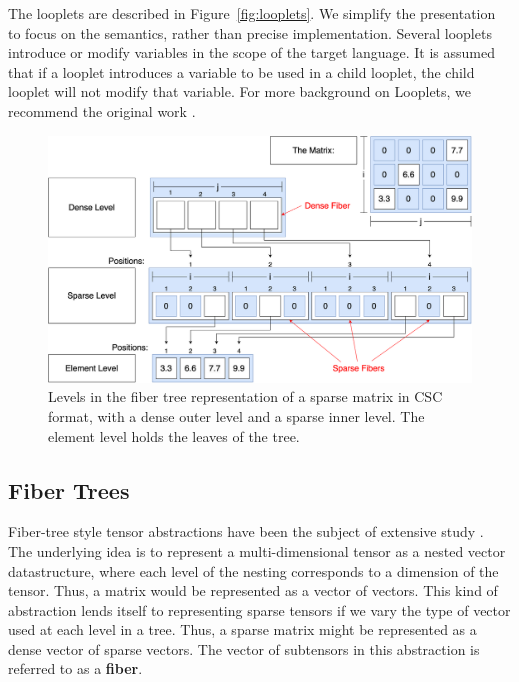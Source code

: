 The looplets are described in Figure~\ref{fig:looplets}. We simplify the presentation to focus on the semantics, rather than precise implementation. Several looplets introduce or modify variables in the scope of the target language. It is assumed that if a looplet introduces a variable to be used in a child looplet, the child looplet will not modify that variable. For more background on Looplets, we recommend the original work \cite{ahrens_looplets_2023}. 

\begin{figure}
    \centering
    \vspace{-28pt}
    \includegraphics[width=\linewidth]{LevelsVsFibers-matrix.png}
    \vspace{-16pt}
    \caption{Levels in the fiber tree representation of a sparse matrix in CSC format, with a dense outer level and a sparse inner level. The element level holds the leaves of the tree.}
    \label{fig:levelsvsfibers}
    \vspace{-24pt}
\end{figure}
\subsection{Fiber Trees}

Fiber-tree style tensor abstractions have been the subject of extensive study
\cite{sze2017efficient, chou2022compilation, chou2018format}.  The underlying
idea is to represent a multi-dimensional tensor as a nested vector
datastructure, where each level of the nesting corresponds to a dimension of the
tensor. Thus, a matrix would be represented as a vector of vectors. This kind of
abstraction lends itself to representing sparse tensors if we vary the type of
vector used at each level in a tree. Thus, a sparse matrix might be represented
as a dense vector of sparse vectors. The vector of subtensors in this
abstraction is referred to as a \textbf{fiber}.

